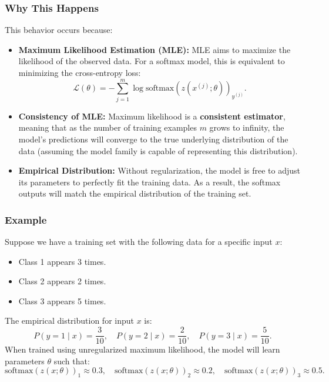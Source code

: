 \begin{notechapter}
\subsubsection{Why This Happens}
This behavior occurs because:
\begin{itemize}
    \item \textbf{Maximum Likelihood Estimation (MLE):} MLE aims to maximize the likelihood of the observed data. For a softmax model, this is equivalent to minimizing the cross-entropy loss:
          \[
          \mathcal{L}(\theta) = -\sum_{j=1}^m \log \text{softmax}(z(x^{(j)}; \theta))_{y^{(j)}}.
          \]
    \item \textbf{Consistency of MLE:} Maximum likelihood is a \textbf{consistent estimator}, meaning that as the number of training examples \( m \) grows to infinity, the model's predictions will converge to the true underlying distribution of the data (assuming the model family is capable of representing this distribution).
    \item \textbf{Empirical Distribution:} Without regularization, the model is free to adjust its parameters to perfectly fit the training data. As a result, the softmax outputs will match the empirical distribution of the training set.
\end{itemize}

\subsubsection{Example}
Suppose we have a training set with the following data for a specific input \( x \):
\begin{itemize}
    \item Class 1 appears 3 times.
    \item Class 2 appears 2 times.
    \item Class 3 appears 5 times.
\end{itemize}
The empirical distribution for input \( x \) is:
\[
P(y = 1 \mid x) = \frac{3}{10}, \quad P(y = 2 \mid x) = \frac{2}{10}, \quad P(y = 3 \mid x) = \frac{5}{10}.
\]
When trained using unregularized maximum likelihood, the model will learn parameters \( \theta \) such that:
\[
\text{softmax}(z(x; \theta))_1 \approx 0.3, \quad \text{softmax}(z(x; \theta))_2 \approx 0.2, \quad \text{softmax}(z(x; \theta))_3 \approx 0.5.
\]


\end{notechapter}
